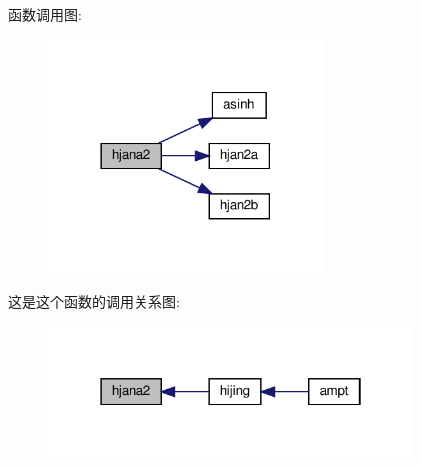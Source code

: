 函数调用图\+:
\nopagebreak
\begin{figure}[H]
\begin{center}
\leavevmode
\includegraphics[width=206pt]{hjana2_8f90_a343d9a46a23ebf1e9daf21fe98479b87_cgraph}
\end{center}
\end{figure}
这是这个函数的调用关系图\+:
\nopagebreak
\begin{figure}[H]
\begin{center}
\leavevmode
\includegraphics[width=274pt]{hjana2_8f90_a343d9a46a23ebf1e9daf21fe98479b87_icgraph}
\end{center}
\end{figure}
